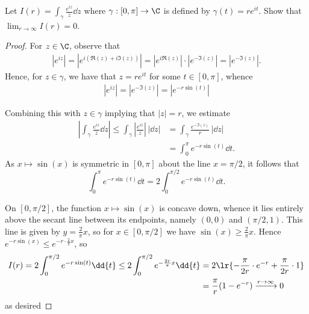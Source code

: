 \documentclass[12pt]{article}
\begin{document}
\begin{homeworkProblem}
  Let $ I(r) = \displaystyle\int_{\gamma}\frac{e^{iz}}{z}\dd{z} $ where $ \gamma:[0,\pi]\to \C $ is defined by $ \gamma(t) = re^{it} $. Show that $ \displaystyle\lim_{r\to\infty}I(r) = 0 $.

  \begin{proof}
    For $ z\in\C $, observe that
    \begin{align*}
      |e^{iz}| = |e^{i(\Re(z)+i\Im(z))}| = |e^{i\Re(z)}|\cdot|e^{-\Im(z)}| = |e^{-\Im(z)}|.
    \end{align*} 
    Hence, for $ z\in \gamma $, we have that $ z = re^{it} $ for some $ t\in [0,\pi] $, whence 
    \begin{align*}
      |e^{iz}| = |e^{-\Im(z)}| = |e^{-r\sin(t)}|
    \end{align*}


    Combining this with $ z\in \gamma $ implying that $ |z| = r $, we estimate
    \begin{align*}
      \left|\int_{\gamma}\frac{e^{iz}}{z}\dd{z}\right| \leq \int_{\gamma} \left|\frac{e^{iz}}{z}\right|\, |\dd{z}|&=\int_{\gamma}\frac{e^{-\Im(z)}}{r}\, |\dd{z}|\\ 
      &=\int_{0}^{\pi} e^{-r\sin(t)} \dd{t}.
    \end{align*}
    As $ x\mapsto\sin(x) $ is symmetric in $ [0,\pi] $ about the line $ x = \pi/2 $, it follows that 
    \[
       \int_{0}^{\pi} e^{-r\sin(t)} \dd{t} = 2\int_{0}^{\pi/2} e^{-r\sin(t)} \dd{t}.
    \]

    On $ [0,\pi/2] $, the function $ x\mapsto\sin(x) $ is concave down, whence it lies entirely above the secant line between its endpoints, namely $ (0,0) $ and $ (\pi/2, 1) $. This line is given by $ y=\frac{2}{\pi}x $, so for $ x\in [0,\pi/2] $ we have $ \sin(x)\geq \frac{2}{\pi}x $. Hence $ e^{-r\sin(x)}\leq e^{-r\cdot \frac{2}{\pi}x} $, so 
    \begin{align*}
      I(r) = 2\int_{0}^{\pi/2} e^{-r\sin(t)} \dd{t} \leq 2\int_{0}^{\pi/2} e^{-\frac{2r}{\pi}x} \dd{t}  &= 2\lr{-\frac{\pi}{2r}\cdot e^{-r} + \frac{\pi}{2r}\cdot 1}\\
      &= \frac{\pi}{r} (1-e^{-r}) \xrightarrow{r\to\infty}0
    \end{align*}
    as  desired
  \end{proof}
\end{homeworkProblem}
\end{document}
